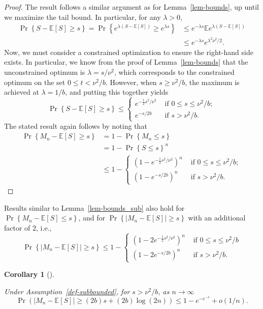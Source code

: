 \documentclass[
  12pt]{article}
\newcommand{\E}{\mathbb{E}}
\theoremstyle{definition}
\theoremstyle{plain}
\newtheorem{corollary}{Corollary}[section]
\theoremstyle{plain}
\theoremstyle{plain}
\theoremstyle{remark}
\begin{document}
\begin{proof}
The result follows a similar argument as for Lemma~\ref{lem-bounds}, up
until we maximize the tail bound. In particular, for any \(\lambda>0\),
\begin{align*}
  \Pr\left\{ S-\E[S]\ge s\right\} =
  \Pr\left\{e^{\lambda (S-\E[S])}\ge e^{\lambda s}\right\}
    & \le e^{-\lambda s}\E e^{\lambda (S-\E[S])} \\
    & \le e^{-\lambda s}e^{\lambda^2\nu^2/2}.
\end{align*} Now, we must consider a constrained optimization to ensure
the right-hand side exists. In particular, we know from the proof of
Lemma~\ref{lem-bounds} that the unconstrained optimum is
\(\lambda=s/\nu^2\), which corresponds to the constrained optimum on the
set \(0\le t<\nu^2/b\). However, when \(s\ge \nu^2/b\), the maximum is
achieved at \(\lambda=1/b\), and putting this together yields \[
  \Pr\left\{S-\E[S]\ge s\right\}\le
  \begin{cases}
    e^{-\frac{1}{2}s^2/\nu^2} & \text{ if }0\le s\le \nu^2/b; \\
    e^{-s/2b}                 & \text{ if } s>\nu^2/b.
  \end{cases}
\] The stated result again follows by noting that \begin{align*}
  \Pr\left\{M_n-\E[S]\ge s\right\}
    & = 1-\Pr\left\{M_n\le s\right\} \\
    & = 1-\Pr\left\{S\le s\right\}^n \\
    & \le 1-
  \begin{cases}
    (1-e^{-\frac{1}{2}s^2/\nu^2})^n & \text{ if } 0\le s\le \nu^2/b; \\
    (1-e^{-s/2b})^n                 & \text{ if } s>\nu^2/b.
  \end{cases}
\end{align*}
\end{proof}

Results similar to Lemma~\ref{lem-bounds_sub} also hold for
\(\Pr\left\{M_n-\E[S]\le s\right\}\), and for
\(\Pr\left\{|M_n-\E[S]|\ge s\right\}\) with an additional factor of
\(2\), i.e., \[
\Pr\left\{|M_n-\E[S]|\ge s\right\}\le 1-
\begin{cases}
  (1-2e^{-\frac{1}{2}s^2/\nu^2})^n & \text{ if }0\le s\le \nu^2/b \\
  (1-2e^{-s/2b})^n                 & \text{ if }s>\nu^2/b.
\end{cases}
\]

\begin{corollary}[]\protect\hypertarget{cor-two}{}\label{cor-two}

Under Assumption~\ref{def-subbounded}, for \(s>\nu^2/b\), as
\(n\rightarrow\infty\) \[
    \Pr\left(|M_n-\E[S]|\ge (2b)s+(2b)\log(2n)\right)\le 1-e^{-e^{-s}}+o(1/n).
\]

\end{corollary}
\end{document}
